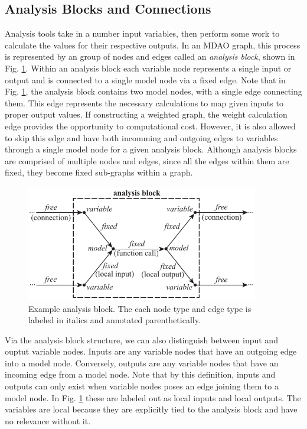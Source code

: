 \subsection{Analysis Blocks and Connections}

Analysis tools take in a number input variables, then perform some work to calculate 
the values for their respective outputs. In an MDAO graph, this process is 
represented by an group of nodes and edges called an \emph{analysis block}, 
shown in Fig. \ref{f:analysis block}. Within an analysis block each variable 
node represents a single input or output and is connected 
to a single model node via a fixed edge. Note that in Fig. \ref{f:analysis block}, 
the analysis block contains two model nodes, with a single edge connecting them. 
This edge represents the necessary calculations to map given inputs 
to proper output values. If constructing a weighted graph, the weight calculation edge 
provides the opportunity to computational cost. However, it is also allowed to skip 
this edge and have both incomming and outgoing edges to variables through a single model 
node for a given analysis block. Although analysis blocks are comprised of multiple nodes and edges, since all 
the edges within them are fixed, they become fixed sub-graphs within a graph.

\begin{figure}[htb!]
    \begin{center}
    \includegraphics[width=4in]{images/analysis_block}
    \end{center}
    \vspace{-10pt}
\caption{Example analysis block. The each node type and edge type is labeled in italics and annotated parenthetically.}
\label{f:analysis block}
\end{figure}

Via the analysis block structure, we can also distinguish between input and ouptut
variable nodes. Inputs are any variable nodes that have an outgoing edge into a model 
node. Conversely, outputs are any variable nodes that have an incoming edge from a model node. 
Note that by this definition, inputs and outputs can only exist when variable nodes poses an 
edge joining them to a model node. In Fig. \ref{f:analysis block} these are labeled out as 
local inputs and local outputs. The variables are local because they are explicitly tied
to the analysis block and have no relevance without it. 

